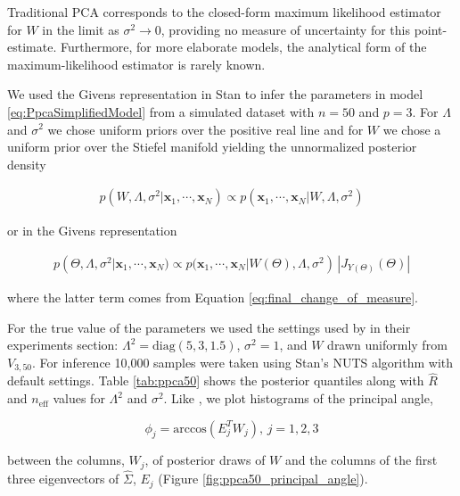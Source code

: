 \documentclass[ba]{imsart}
\newcommand{\mb}[1]{\mathbf{#1}}
\numberwithin{equation}{section}
\theoremstyle{plain}
\begin{document}
\noindent Traditional PCA corresponds to the closed-form maximum likelihood estimator for $W$ in the limit as $\sigma^2 \to 0$,  providing no measure of uncertainty for this point-estimate. Furthermore, for more elaborate models, the analytical form of the maximum-likelihood estimator is rarely known.

\noindent We used the Givens representation in Stan to infer the parameters in model \ref{eq:PpcaSimplifiedModel} from a simulated dataset with $n = 50$ and $p = 3$. For  $\Lambda$ and $\sigma^2$ we chose uniform priors over the positive real line and for $W$ we chose a uniform prior over the Stiefel manifold yielding the unnormalized posterior density

\begin{eqnarray}
p(W, \Lambda, \sigma^2 | \mb{x}_1, \cdots, \mb{x}_N) \propto p(\mb{x}_1, \cdots, \mb{x}_N | W, \Lambda, \sigma^2)
\end{eqnarray}

\noindent or in the Givens representation

\begin{eqnarray}
\label{eq:ppca_density_givens}
p(\Theta, \Lambda, \sigma^2 | \mb{x}_1, \cdots, \mb{x}_N) \propto p(\mb{x}_1, \cdots, \mb{x}_N | W(\Theta), \Lambda, \sigma^2)\, |J_{Y(\Theta)}(\Theta)|
\end{eqnarray}

\noindent where the latter term comes from Equation \ref{eq:final_change_of_measure}.

\noindent For the true value of the parameters we used the settings used by \citet{jauch2018random} in their experiments section: $\Lambda^2 = \mathrm{diag}(5, 3, 1.5)$, $\sigma^2 = 1$, and $W$ drawn uniformly from $V_{3, 50}$. For inference 10,000 samples were taken using Stan's NUTS algorithm with default settings. Table \ref{tab:ppca50} shows the posterior quantiles along with $\hat{R}$ and $n_{\mathrm{eff}}$ values for $\Lambda^2$ and $\sigma^2$. Like \citet{jauch2018random}, we plot histograms of the principal angle,

\begin{equation}
\phi_j = \mathrm{arccos}(E_j^T W_j),\, j=1,2,3
\end{equation}

\noindent between the columns, $W_j$, of posterior draws of $W$ and the columns of the first three eigenvectors of $\hat{\Sigma}$, $E_j$ (Figure \ref{fig:ppca50_principal_angle}).
\end{document}
